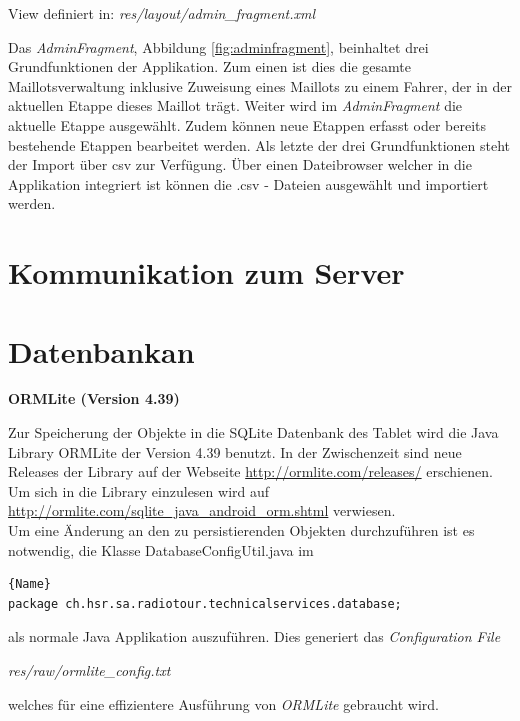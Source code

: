 View definiert in:
\textit{res/layout/admin\_fragment.xml} 

Das \textit{AdminFragment}, Abbildung \ref{fig:adminfragment}, beinhaltet drei Grundfunktionen der Applikation.
Zum einen ist dies die gesamte Maillotsverwaltung inklusive Zuweisung eines Maillots zu einem Fahrer, der in der aktuellen Etappe dieses Maillot trägt.
Weiter wird im \textit{AdminFragment} die aktuelle Etappe ausgewählt. Zudem können neue Etappen erfasst oder bereits bestehende Etappen bearbeitet werden. 
Als letzte der drei Grundfunktionen steht der Import über csv zur Verfügung. Über einen Dateibrowser welcher in die Applikation integriert ist können die .csv - Dateien ausgewählt und importiert werden.  

\section{Kommunikation zum Server}



\section{Datenbankan}
\textbf{ORMLite (Version 4.39)}

 
Zur Speicherung der Objekte in die SQLite Datenbank des Tablet wird die Java Library ORMLite der Version 4.39 benutzt. In der Zwischenzeit sind neue Releases der Library auf der Webseite \url{http://ormlite.com/releases/} erschienen. Um sich in die Library einzulesen wird auf \url{http://ormlite.com/sqlite_java_android_orm.shtml} verwiesen.
\\
Um eine Änderung an den zu persistierenden Objekten durchzuführen ist es notwendig, die Klasse DatabaseConfigUtil.java im

\begin{lstlisting}{Name}
package ch.hsr.sa.radiotour.technicalservices.database;
\end{lstlisting}

als normale Java Applikation auszuführen. Dies generiert das \textit{Configuration File}

\textit{res/raw/ormlite\_config.txt}

welches für eine effizientere Ausführung von \textit{ORMLite} gebraucht wird.



